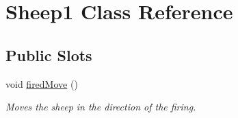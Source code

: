 \hypertarget{classSheep1}{\section{\-Sheep1 \-Class \-Reference}
\label{classSheep1}
}
\subsection*{\-Public \-Slots}
\begin{DoxyCompactItemize}
\item 
void \hyperlink{classSheep1_a1d152e5c8c94201d057c40a63f7ec33b}{fired\-Move} ()
\begin{DoxyCompactList}\small\item\em \-Moves the sheep in the direction of the firing. \end{DoxyCompactList}\end{DoxyCompactItemize}
